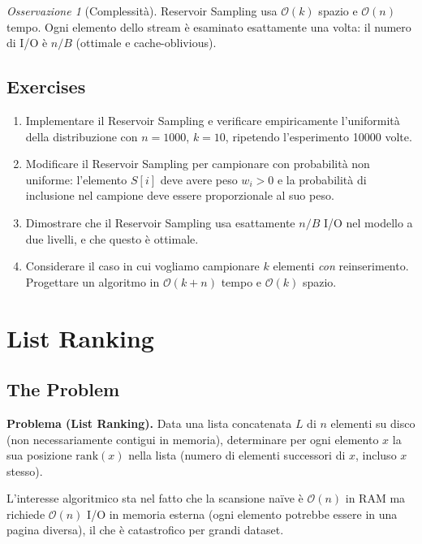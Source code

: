 \documentclass[12pt, a4paper, oneside]{book}
\theoremstyle{plain}
\theoremstyle{definition}
\theoremstyle{remark}
\newtheorem{osservazione}[teorema]{Osservazione}
\newcommand{\OO}[1]{\mathcal{O}\!\left(#1\right)}
\begin{document}
\begin{osservazione}[Complessità]
Reservoir Sampling usa $\OO{k}$ spazio e $\OO{n}$ tempo. Ogni elemento dello stream è esaminato esattamente una volta: il numero di I/O è $n/B$ (ottimale e cache-oblivious).
\end{osservazione}

\section{Exercises}

\begin{enumerate}
  \item Implementare il Reservoir Sampling e verificare empiricamente l'uniformità della distribuzione con $n=1000$, $k=10$, ripetendo l'esperimento 10000 volte.
  \item Modificare il Reservoir Sampling per campionare con probabilità non uniforme: l'elemento $S[i]$ deve avere peso $w_i > 0$ e la probabilità di inclusione nel campione deve essere proporzionale al suo peso.
  \item Dimostrare che il Reservoir Sampling usa esattamente $n/B$ I/O nel modello a due livelli, e che questo è ottimale.
  \item Considerare il caso in cui vogliamo campionare $k$ elementi \emph{con} reinserimento. Progettare un algoritmo in $\OO{k + n}$ tempo e $\OO{k}$ spazio.
\end{enumerate}

\chapter{List Ranking}

\section{The Problem}

\begin{problembox}
\textbf{Problema (List Ranking).} Data una lista concatenata $L$ di $n$ elementi su disco (non necessariamente contigui in memoria), determinare per ogni elemento $x$ la sua posizione $\mathrm{rank}(x)$ nella lista (numero di elementi successori di $x$, incluso $x$ stesso).
\end{problembox}

L'interesse algoritmico sta nel fatto che la scansione naïve è $\OO{n}$ in RAM ma richiede $\OO{n}$ I/O in memoria esterna (ogni elemento potrebbe essere in una pagina diversa), il che è catastrofico per grandi dataset.
\end{document}
